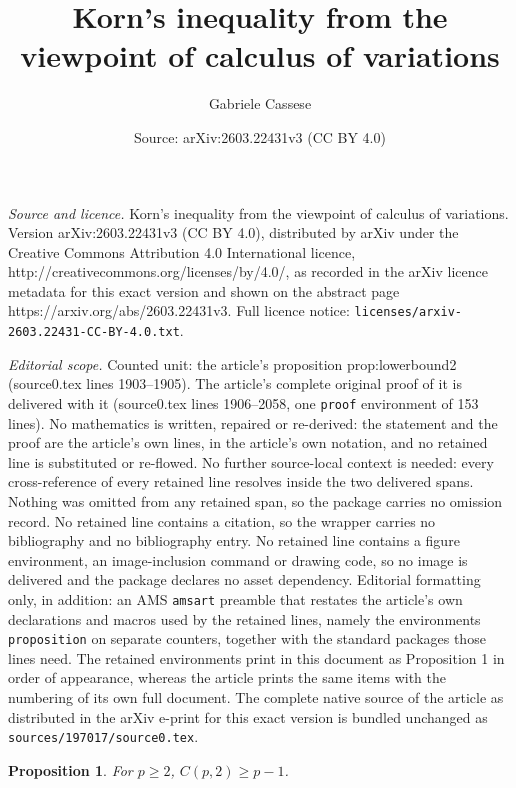 \documentclass[10pt,a4paper]{amsart}
\title{Korn's inequality from the viewpoint of calculus of variations}
\author{Gabriele Cassese}
\date{Source: arXiv:2603.22431v3 (CC BY 4.0)}
\newtheorem{proposition}{Proposition}
\begin{document}
\maketitle

\noindent\emph{Source and licence.} Korn's inequality from the viewpoint of calculus of variations. Version arXiv:2603.22431v3 (CC BY 4.0), distributed by arXiv under the Creative Commons Attribution 4.0 International licence, http://creativecommons.org/licenses/by/4.0/, as recorded in the arXiv licence metadata for this exact version and shown on the abstract page https://arxiv.org/abs/2603.22431v3. Full licence notice: \texttt{licenses/arxiv-2603.22431-CC-BY-4.0.txt}.\par\smallskip

\noindent\textit{Editorial scope.} Counted unit: the article's proposition prop:lowerbound2 (source0.tex lines 1903--1905). The article's complete original proof of it is delivered with it (source0.tex lines 1906--2058, one \texttt{proof} environment of 153 lines). No mathematics is written, repaired or re-derived: the statement and the proof are the article's own lines, in the article's own notation, and no retained line is substituted or re-flowed.  No further source-local context is needed: every cross-reference of every retained line resolves inside the two delivered spans.  Nothing was omitted from any retained span, so the package carries no omission record.  No retained line contains a citation, so the wrapper carries no bibliography and no bibliography entry.  No retained line contains a figure environment, an image-inclusion command or drawing code, so no image is delivered and the package declares no asset dependency.  Editorial formatting only, in addition: an AMS \texttt{amsart} preamble that restates the article's own declarations and macros used by the retained lines, namely the environments \texttt{proposition} on separate counters, together with the standard packages those lines need.  The retained environments print in this document as Proposition 1 in order of appearance, whereas the article prints the same items with the numbering of its own full document.  The complete native source of the article as distributed in the arXiv e-print for this exact version is bundled unchanged as \texttt{sources/197017/source0.tex}.
\begin{proposition}\label{prop:lowerbound2}
For $p\ge 2$, $C(p,2)\ge p-1$.
\end{proposition}
\end{document}
